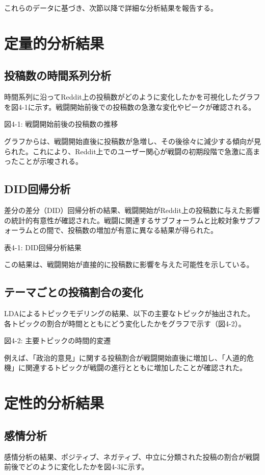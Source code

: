 \documentclass[11pt, a4j]{jreport}
\begin{document}
    これらのデータに基づき、次節以降で詳細な分析結果を報告する。

    \section{定量的分析結果}
    \subsection{投稿数の時間系列分析}
    時間系列に沿ってReddit上の投稿数がどのように変化したかを可視化したグラフを図4-1に示す。戦闘開始前後での投稿数の急激な変化やピークが確認される。

    図4-1: 戦闘開始前後の投稿数の推移

    グラフからは、戦闘開始直後に投稿数が急増し、その後徐々に減少する傾向が見られた。これにより、Reddit上でのユーザー関心が戦闘の初期段階で急激に高まったことが示唆される。

    \subsection{DID回帰分析}
    差分の差分（DID）回帰分析の結果、戦闘開始がReddit上の投稿数に与えた影響の統計的有意性が確認された。戦闘に関連するサブフォーラムと比較対象サブフォーラムとの間で、投稿数の増加が有意に異なる結果が得られた。

    表4-1: DID回帰分析結果

    この結果は、戦闘開始が直接的に投稿数に影響を与えた可能性を示している。

    \subsection{テーマごとの投稿割合の変化}
    LDAによるトピックモデリングの結果、以下の主要なトピックが抽出された。各トピックの割合が時間とともにどう変化したかをグラフで示す（図4-2）。

    図4-2: 主要トピックの時間的変遷

    例えば、「政治的意見」に関する投稿割合が戦闘開始直後に増加し、「人道的危機」に関連するトピックが戦闘の進行とともに増加したことが確認された。

    \section{定性的分析結果}
    \subsection{感情分析}
    感情分析の結果、ポジティブ、ネガティブ、中立に分類された投稿の割合が戦闘前後でどのように変化したかを図4-3に示す。
\end{document}
